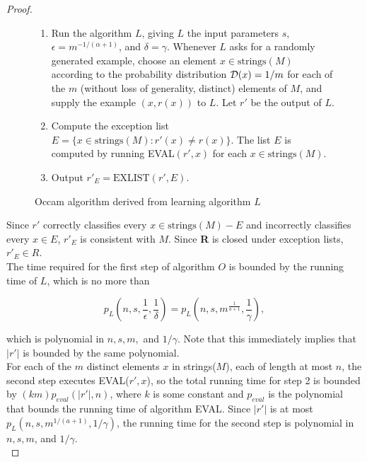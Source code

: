 \documentclass[12pt]{article}
\newcommand{\cald}{{\cal D}}
\begin{document}
\begin{proof}
\begin{figure} [!b]
  \begin{framed}
    \begin{enumerate}
      \item Run the algorithm $L$, giving $L$ the input parameters $s$, $\epsilon = m^{-1 / (\alpha + 1)}$, and $\delta = \gamma$. Whenever $L$ asks for a randomly generated example, choose an element $x \in \text{strings}(M)$ according to the probability distribution $\cald(x) = 1/ m$ for each of the $m$ (without loss of generality, distinct) elements of $M$, and supply the example $(x, r(x))$ to $L$. Let $r'$ be the output of $L$.
      \item Compute the exception list $E = \{ x \in \text {strings}(M): r'(x) \neq r(x) \}$. The list $E$ is computed by running EVAL$(r',x)$ for each $x \in \text {strings}(M)$.
      \item Output $r'_E = \text {EXLIST}(r', E)$.
    \end{enumerate}
  \end{framed}
  \caption{Occam algorithm derived from learning algorithm $L$ \label{fig:o}}
\end{figure}

Since $r'$ correctly classifies every $x \in \text {strings}(M) - E$ and incorrectly classifies every $x \in E$, $r'_E$ is consistent with $M$. Since {\bf R} is closed under exception lists, $r'_E \in R$. \\

The time required for the first step of algorithm $O$ is bounded by the running time of $L$, which is no more than

\begin{equation*}
p_L(n, s, \frac {1}{\epsilon}, \frac {1}{\delta}) = p_L(n, s, m^{\frac {1}{a + 1}}, \frac {1}{\gamma}),
\end{equation*}

which is polynomial in $n, s, m,$ and $1 / \gamma$. Note that this immediately implies that $|r'|$ is bounded by the same polynomial. \\

For each of the $m$ distinct elements $x$ in strings($M$), each of length at most $n$, the second step executes EVAL($r', x$), so the total running time for step 2 is bounded by $(km)p_{eval}(|r'|, n)$, where $k$ is some constant and $p_{eval}$ is the polynomial that bounds the running time of algorithm EVAL. Since $|r'|$ is at most $p_L(n, s, m^{1/(a+1)}, 1 / \gamma)$, the running time for the second step is polynomial in $n, s, m$, and $1 / \gamma$. \\


\end{proof}
\end{document}
